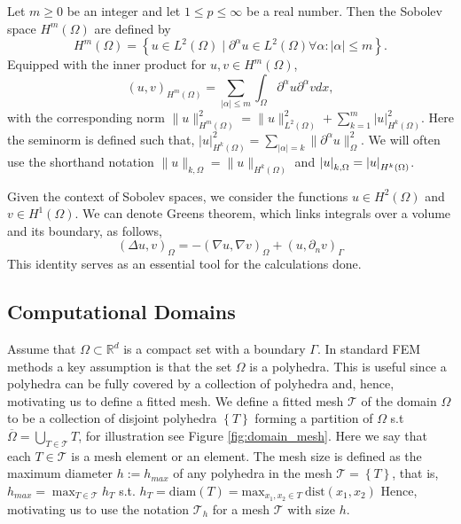   Let $m\ge 0$ be an integer and let $1 \le  p \le  \infty$ be a real number. Then the Sobolev space $H^{m}( \Omega ) $ are defined by
\[
H^{m}\left( \Omega  \right) = \left\{ u \in L^{2}\left( \Omega  \right)  \mid  \partial ^{\alpha } u \in L^{2}\left( \Omega  \right)  \forall \alpha : \left\lvert \alpha  \right\rvert  \le m \right\}.
\]
Equipped with the inner product for $u,v \in H^{m}\left( \Omega  \right) $, \[
    \left( u,v \right) _{H^{m}\left( \Omega   \right) } = \sum_{\left\lvert \alpha  \right\rvert  \le  m}^{}  \int_{\Omega }^{} \partial ^{\alpha } u \partial ^{\alpha } v dx,
\]
with the corresponding norm
$
\| u \|_{ H^{m}\left( \Omega  \right)  }^{2  }  =  \| u \|_{ L^{2}\left( \Omega  \right)    }^{2} + \sum_{k = 1}^{m}  \left\lvert u \right\rvert ^{2} _{  H^{k}\left( \Omega  \right) }.
$
Here the seminorm is defined such that, $ \left\lvert u \right\rvert _{H^{k}( \Omega  ) }^{2} =  \sum_{\left\lvert \alpha  \right\rvert  = k}^{} \| \partial ^{\alpha }u \|_{ \Omega  }^{ 2 }  .
$
We will often use the shorthand notation $ \| u \|_{ k, \Omega  }^{  } = \| u \|_{ H^{k}( \Omega)  }^{  } $ and $ \left\lvert  u  \right\rvert_{ k, \Omega  }^{  }  = \left\lvert  u  \right\rvert_{ H^{k}( \Omega)  }^{  }$.

Given the context of Sobolev spaces, we consider the functions $ u \in H^{2}( \Omega )$ and $ v \in H^{1}( \Omega )$. We can denote Greens theorem, which links integrals over a volume and its boundary, as follows,
\[
( \Delta u, v) _{\Omega } = -( \nabla u, \nabla v)_{\Omega } + ( u, \partial _{n}v)_{\Gamma }
\]
This identity serves as an essential tool for the calculations done.



\subsection{Computational Domains}%
\label{sub:computational_domain}
Assume that $\Omega \subset \mathbb{R} ^{d} $ is a compact set with a boundary  $\Gamma $. In standard FEM methods a key assumption is that the set $\Omega $ is a polyhedra. This is useful since a polyhedra can be fully covered by a collection of polyhedra and, hence, motivating us to define a fitted mesh.
We define a fitted mesh $\mathcal{T} $ of the domain $\Omega $ to be a collection of disjoint polyhedra $\left\{ T \right\}  $ forming a partition of $\Omega $ s.t $\overline{\Omega } = \bigcup _{T \in \mathcal{T} } T $, for illustration see Figure
\ref{fig:domain_mesh}.
Here we say that each $T \in  \mathcal{T} $ is a mesh element or an element.
The mesh size is defined as the maximum diameter $h := h_{max} $ of any polyhedra in the mesh $\mathcal{T} = \left\{ T \right\}  $, that is, $ h_{max} = \max_{T \in \mathcal{T} }  h_{T}$ s.t.
$h _{T}  = \mathrm{diam}\left( T \right)   = \mathrm{max}_{x_1, x_{2} \in T} \ \mathrm{ dist }(x_{1}, x_{2})$
Hence, motivating us to use the notation $\mathcal{T} _{h}$ for a mesh $\mathcal{T} $ with size $h$.

